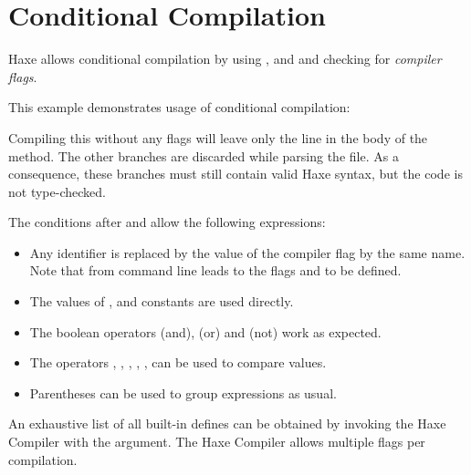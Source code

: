 \documentclass{haxe}
\begin{document}
\section{Conditional Compilation}
\label{lf-condition-compilation}

Haxe allows conditional compilation by using ,  and  and checking for \emph{compiler flags}.


This example demonstrates usage of conditional compilation:


Compiling this without any flags will leave only the  line in the body of the  method. The other branches are discarded while parsing the file. As a consequence, these branches must still contain valid Haxe syntax, but the code is not type-checked.

The conditions after  and  allow the following expressions:

\begin{itemize}
	\item Any identifier is replaced by the value of the compiler flag by the same name. Note that  from command line leads to the flags  and  to be defined.
	\item The values of ,  and  constants are used directly.
	\item The boolean operators \expr{\&\&} (and), \expr{||} (or) and \expr{!} (not) work as expected.
	\item The operators \expr{==}, \expr{!=}, \expr{>}, \expr{>=}, \expr{<}, \expr{<=} can be used to compare values.
	\item Parentheses \expr{()} can be used to group expressions as usual.
\end{itemize}

An exhaustive list of all built-in defines can be obtained by invoking the Haxe Compiler with the  argument. The Haxe Compiler allows multiple  flags per compilation.
\end{document}

